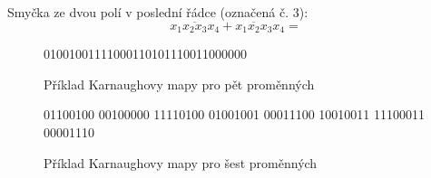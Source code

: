      Smyčka ze dvou polí v poslední řádce (označená č. 3):
     \begin{equation}
       x_1\overline{x_2x_3}x_4 + x_1\overline{x_2}x_3x_4 = 
     \end{equation}     
     \begin{figure}[ht!]
         \centering
            {01001001111000110101110011000000}{}  
        \caption{Příklad Karnaughovy mapy pro pět proměnných}\label{CES:karnaugh_5}
      \end{figure}

     \begin{figure}[hb!]
         \centering                 
          {{0}{1}{1}{0}{0}{1}{0}{0}%
           {0}{0}{1}{0}{0}{0}{0}{0}%
           {1}{1}{1}{1}{0}{1}{0}{0}%
           {0}{1}{0}{0}{1}{0}{0}{1}%
           {0}{0}{0}{1}{1}{1}{0}{0}%
           {1}{0}{0}{1}{0}{0}{1}{1}%
           {1}{1}{1}{0}{0}{0}{1}{1}%
           {0}{0}{0}{0}{1}{1}{1}{0}}{}%
        \caption{Příklad Karnaughovy mapy pro šest proměnných}\label{CES:karnaugh_6}
      \end{figure}

\printbibliography[title={Seznam literatury}, heading=subbibliography]
